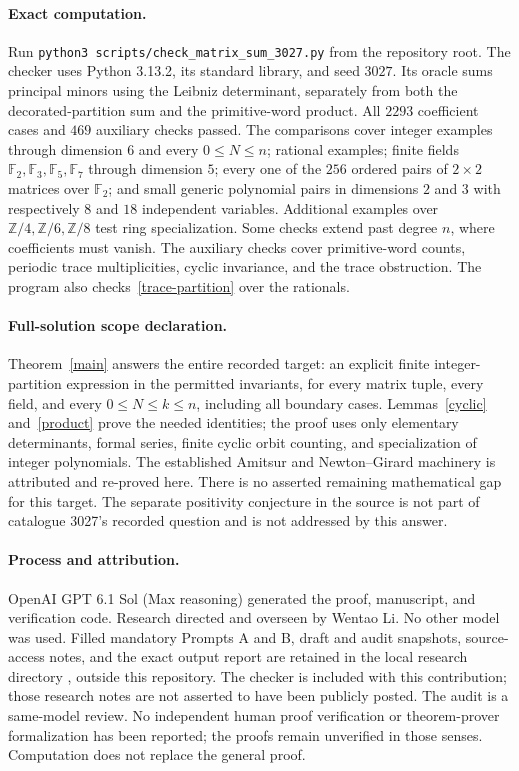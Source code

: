 \documentclass[11pt]{article}
\begin{document}
\paragraph{Exact computation.}
Run \texttt{python3 scripts/check\_matrix\_sum\_3027.py} from the repository
root. The checker uses Python 3.13.2, its standard library, and seed $3027$.
Its oracle sums principal minors using the Leibniz determinant, separately
from both the decorated-partition sum and the primitive-word product.
All $2293$ coefficient cases and $469$ auxiliary checks passed.
The comparisons cover integer examples through dimension $6$ and every
$0\leq N\leq n$; rational examples; finite fields
$\mathbb F_2,\mathbb F_3,\mathbb F_5,\mathbb F_7$ through dimension $5$;
every one of the $256$ ordered pairs of $2\times2$ matrices over
$\mathbb F_2$; and small generic polynomial pairs in dimensions $2$ and
$3$ with respectively $8$ and $18$ independent variables.
Additional examples over $\mathbb Z/4,\mathbb Z/6,\mathbb Z/8$ test ring
specialization. Some checks extend past degree $n$, where coefficients
must vanish. The auxiliary checks cover primitive-word counts, periodic
trace multiplicities, cyclic invariance, and the trace obstruction.
The program also checks~\eqref{trace-partition} over the rationals.

\paragraph{Full-solution scope declaration.}
Theorem~\ref{main} answers the entire recorded target: an explicit finite
integer-partition expression in the permitted invariants, for every matrix
tuple, every field, and every $0\leq N\leq k\leq n$, including all boundary
cases. Lemmas~\ref{cyclic} and~\ref{product} prove the needed identities;
the proof uses only elementary determinants, formal series, finite cyclic
orbit counting, and specialization of integer polynomials. The established
Amitsur and Newton--Girard machinery is attributed and re-proved here.
There is no asserted remaining mathematical gap for this target.
The separate positivity conjecture in the source is not part of catalogue
3027's recorded question and is not addressed by this answer.

\paragraph{Process and attribution.}
OpenAI GPT 6.1 Sol (Max reasoning) generated the proof, manuscript, and
verification code. Research directed and overseen by Wentao Li.
No other model was used. Filled mandatory Prompts A and B, draft and audit
snapshots, source-access notes, and the exact output report are retained in
the local research directory ,
outside this repository. The checker is included with this contribution;
those research notes are not asserted to have been publicly posted.
The audit is a same-model review. No independent human proof verification
or theorem-prover formalization has been reported; the proofs remain
unverified in those senses. Computation does not replace the general proof.
\end{document}
